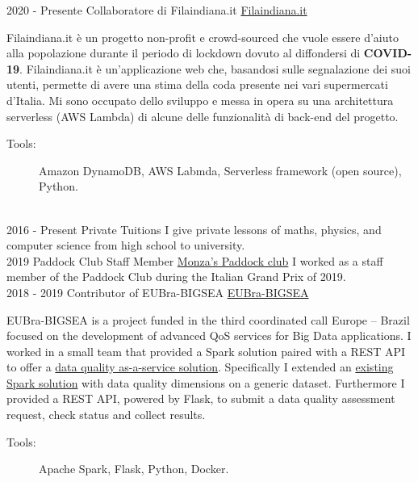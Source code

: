\documentclass[letterpaper]{twentysecondcvit} %
\begin{document}
\begin{twenty} %
\twentyitem
    	{2020 -}
		{Presente}
        {Collaboratore di Filaindiana.it}
        {\href{https://www.filaindiana.it}{Filaindiana.it}}
        {}
        {
        Filaindiana.it è un progetto non-profit e crowd-sourced che vuole essere d'aiuto alla popolazione durante il periodo di lockdown dovuto al diffondersi di \textbf{COVID-19}. Filaindiana.it è un'applicazione web che, basandosi sulle segnalazione dei suoi utenti, permette di avere una stima della coda presente nei vari supermercati d'Italia. Mi sono occupato dello sviluppo e messa in opera su una architettura serverless (AWS Lambda) di alcune delle funzionalità di back-end del progetto. 
        \begin{description}
        \item[Tools:] Amazon DynamoDB, AWS Labmda, Serverless framework (open source), Python.
        \end{description}}
        \\
    \twentyitem
        {2016 -}
        {Present}
        {Private Tuitions}
        {}
        {}
        {I give private lessons of maths, physics, and computer science from high school to university.}
     \\
    \twentyitem
        {2019}
        {}
        {Paddock Club Staff Member}
        {\href{https://tickets.formula1.com/it/h-formula1-hospitality}{Monza's Paddock club}}
        {}
        {I worked as a staff member of the Paddock Club during the Italian Grand Prix of 2019.}
        \\
	\twentyitem
    	{2018 -}
		{2019}
        {Contributor of EUBra-BIGSEA}
        {\href{https://www.eubra-bigsea.eu}{EUBra-BIGSEA}}
        {}
        {EUBra-BIGSEA is a project funded in the third coordinated call Europe – Brazil focused on the development of advanced QoS services for Big Data applications. I worked in a small team that provided a Spark solution paired with a REST API to offer a \href{https://www.eubra-bigsea.eu/node/301}{data quality as-a-service solution}. Specifically I extended an \href{https://www.politesi.polimi.it/handle/10589/134468}{existing Spark solution} with data quality dimensions on a generic dataset. Furthermore I provided a REST API, powered by Flask, to submit a data quality assessment request, check status and collect results.
        \begin{description}
        \item[Tools:] Apache Spark, Flask, Python, Docker.
        \end{description}}        
\end{twenty}
\end{document}
